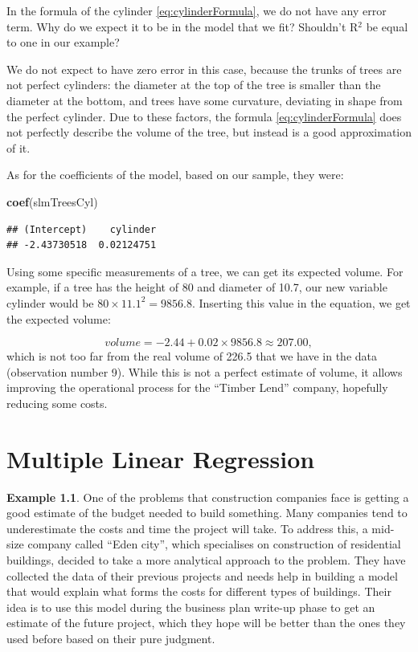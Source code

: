 \documentclass[
]{book}
\newenvironment{Shaded}{\begin{snugshade}}{\end{snugshade}}
\newcommand{\FunctionTok}[1]{\textcolor[rgb]{0.13,0.29,0.53}{\textbf{#1}}}
\newcommand{\NormalTok}[1]{#1}
\theoremstyle{definition}
\theoremstyle{definition}
\newtheorem{example}{Example}[chapter]
\theoremstyle{definition}
\theoremstyle{definition}
\theoremstyle{remark}
\begin{document}
In the formula of the cylinder \eqref{eq:cylinderFormula}, we do not have any error term. Why do we expect it to be in the model that we fit? Shouldn't R\(^2\) be equal to one in our example?

We do not expect to have zero error in this case, because the trunks of trees are not perfect cylinders: the diameter at the top of the tree is smaller than the diameter at the bottom, and trees have some curvature, deviating in shape from the perfect cylinder. Due to these factors, the formula \eqref{eq:cylinderFormula} does not perfectly describe the volume of the tree, but instead is a good approximation of it.

As for the coefficients of the model, based on our sample, they were:

\begin{Shaded}
\begin{Highlighting}[]
\FunctionTok{coef}\NormalTok{(slmTreesCyl)}
\end{Highlighting}
\end{Shaded}

\begin{verbatim}
## (Intercept)    cylinder 
## -2.43730518  0.02124751
\end{verbatim}

Using some specific measurements of a tree, we can get its expected volume. For example, if a tree has the height of 80 and diameter of 10.7, our new variable cylinder would be \(80 \times 11.1^2 = 9856.8\). Inserting this value in the equation, we get the expected volume:

\begin{equation*}
    volume = -2.44 + 0.02 \times 9856.8 \approx 207.00 ,
\end{equation*}
which is not too far from the real volume of 226.5 that we have in the data (observation number 9). While this is not a perfect estimate of volume, it allows improving the operational process for the ``Timber Lend'' company, hopefully reducing some costs.

\chapter{Multiple Linear Regression}\label{linearRegression}

\begin{example}
One of the problems that construction companies face is getting a good estimate of the budget needed to build something. Many companies tend to underestimate the costs and time the project will take. To address this, a mid-size company called ``Eden city'', which specialises on construction of residential buildings, decided to take a more analytical approach to the problem. They have collected the data of their previous projects and needs help in building a model that would explain what forms the costs for different types of buildings. Their idea is to use this model during the business plan write-up phase to get an estimate of the future project, which they hope will be better than the ones they used before based on their pure judgment.
\end{example}
\end{document}
